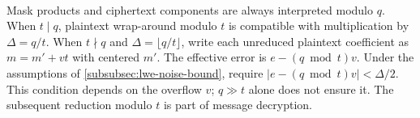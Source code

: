 $ $

 Mask products and ciphertext components are always interpreted modulo $q$. When $t\mid q$, plaintext wrap-around modulo $t$ is compatible with multiplication by $\Delta=q/t$. When $t\nmid q$ and $\Delta=\lfloor q/t\rfloor$, write each unreduced plaintext coefficient as $m=m'+vt$ with centered $m'$. The effective error is $e-(q\bmod t)v$. Under the assumptions of \autoref{subsubsec:lwe-noise-bound}, require $|e-(q\bmod t)v|<\Delta/2$. This condition depends on the overflow $v$; $q\gg t$ alone does not ensure it. The subsequent reduction modulo $t$ is part of message decryption.

 